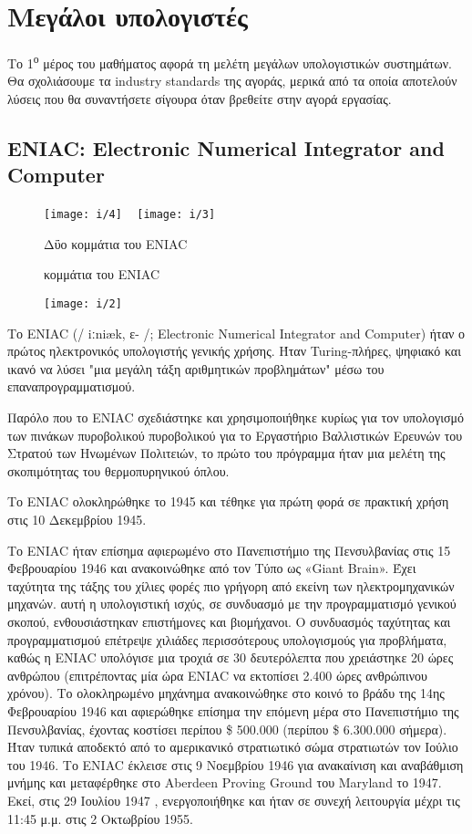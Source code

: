 \documentclass[11pt,a4paper,notitlepage,fleqn]{article}
\begin{document}
\newpage
\section{Μεγάλοι υπολογιστές}
Το 1\textsuperscript{ο} μέρος του μαθήματος αφορά τη μελέτη μεγάλων υπολογιστικών συστημάτων. Θα σχολιάσουμε τα industry standards της αγοράς, μερικά από τα οποία αποτελούν λύσεις που θα συναντήσετε σίγουρα όταν βρεθείτε στην αγορά εργασίας.


\subsection{ENIAC: Electronic Numerical Integrator and Computer}

\begin{figure}[h]
	\centering
	\texttt{[image: i/4]}
~
		\texttt{[image: i/3]}
				\caption{Δΰο κομμάτια του ENIAC}
		\caption{ κομμάτια του ENIAC}
\end{figure}


\begin{figure}[h]
	\centering

	\texttt{[image: i/2]}
\end{figure}

Το ENIAC (/ iːniæk, ɛ- /; Electronic Numerical Integrator and Computer) ήταν ο πρώτος ηλεκτρονικός υπολογιστής γενικής χρήσης. Ήταν Turing-πλήρες, ψηφιακό και ικανό να λύσει "μια μεγάλη τάξη αριθμητικών προβλημάτων" μέσω του επαναπρογραμματισμού.

Παρόλο που το ENIAC σχεδιάστηκε και χρησιμοποιήθηκε κυρίως για τον υπολογισμό των πινάκων πυροβολικού πυροβολικού για το Εργαστήριο Βαλλιστικών Ερευνών του Στρατού των Ηνωμένων Πολιτειών, το πρώτο του πρόγραμμα ήταν μια μελέτη της σκοπιμότητας του θερμοπυρηνικού όπλου.

Το ENIAC ολοκληρώθηκε το 1945 και τέθηκε για πρώτη φορά σε πρακτική χρήση στις 10 Δεκεμβρίου 1945.

Το ENIAC ήταν επίσημα αφιερωμένο στο Πανεπιστήμιο της Πενσυλβανίας στις 15 Φεβρουαρίου 1946 και ανακοινώθηκε από τον Τύπο ως «Giant Brain». Έχει ταχύτητα της τάξης του χίλιες φορές πιο γρήγορη από εκείνη των ηλεκτρομηχανικών μηχανών. αυτή η υπολογιστική ισχύς, σε συνδυασμό με την προγραμματισμό γενικού σκοπού, ενθουσιάστηκαν επιστήμονες και βιομήχανοι. Ο συνδυασμός ταχύτητας και προγραμματισμού επέτρεψε χιλιάδες περισσότερους υπολογισμούς για προβλήματα, καθώς η ENIAC υπολόγισε μια τροχιά σε 30 δευτερόλεπτα που χρειάστηκε 20 ώρες ανθρώπου (επιτρέποντας μία ώρα ENIAC να εκτοπίσει 2.400 ώρες ανθρώπινου χρόνου). Το ολοκληρωμένο μηχάνημα ανακοινώθηκε στο κοινό το βράδυ της 14ης Φεβρουαρίου 1946 και αφιερώθηκε επίσημα την επόμενη μέρα στο Πανεπιστήμιο της Πενσυλβανίας, έχοντας κοστίσει περίπου \$ 500.000 (περίπου \$ 6.300.000 σήμερα). Ήταν τυπικά αποδεκτό από το αμερικανικό στρατιωτικό σώμα στρατιωτών τον Ιούλιο του 1946. Το ENIAC έκλεισε στις 9 Νοεμβρίου 1946 για ανακαίνιση και αναβάθμιση μνήμης και μεταφέρθηκε στο Aberdeen Proving Ground του Maryland το 1947. Εκεί, στις 29 Ιουλίου 1947 , ενεργοποιήθηκε και ήταν σε συνεχή λειτουργία μέχρι τις 11:45 μ.μ. στις 2 Οκτωβρίου 1955.
\end{document}
